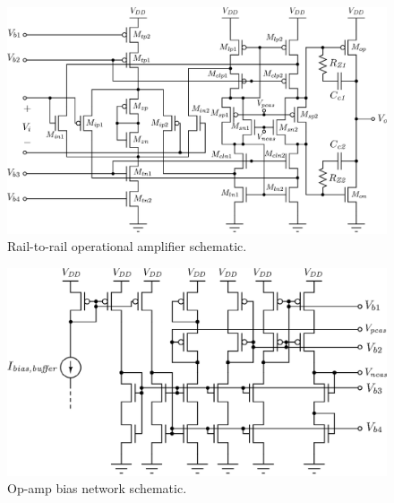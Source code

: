 \begin{figure}[!t]
	\centering
	\includegraphics[width=6in]{./Figures/Filter/buffer_post.eps}
	\caption{Rail-to-rail operational amplifier schematic.}\label{fig:buffer_post}
\end{figure}
\begin{figure}[!t]
	\centering
	\includegraphics[width=5in]{./Figures/Filter/bias_buffer_post.eps}
	\caption{Op-amp bias network schematic.}\label{fig:bias_buffer_post}
\end{figure}


